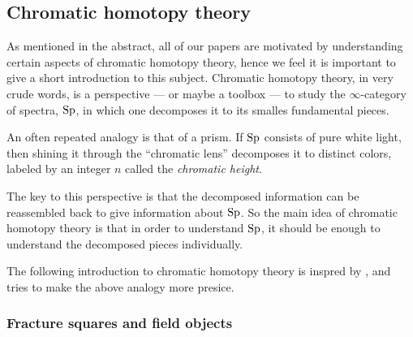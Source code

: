 

\subsection{Chromatic homotopy theory}
\label{ch0:ssec:chromatic-homotopy-theory}

As mentioned in the abstract, all of our papers are motivated by understanding certain aspects of chromatic homotopy theory, hence we feel it is important to give a short introduction to this subject. Chromatic homotopy theory, in very crude words, is a perspective --- or maybe a toolbox --- to study the $\infty$-category of spectra, $\mathrm{Sp}$, in which one decomposes it to its smalles fundamental pieces. 

An often repeated analogy is that of a prism. If $\mathrm{Sp}$ consists of pure white light, then shining it through the ``chromatic lens'' decomposes it to distinct colors, labeled by an integer $n$ called the \emph{chromatic height}. 

\begin{center}
\end{center}

The key to this perspective is that the decomposed information can be reassembled back to give information about $\mathrm{Sp}$. So the main idea of chromatic homotopy theory is that in order to understand $\mathrm{Sp}$, it should be enough to understand the decomposed pieces individually. 

The following introduction to chromatic homotopy theory is inspred by \cite{barthel-beaudry_19}, and tries to make the above analogy more presice. 

\subsubsection{Fracture squares and field objects}
\label{ch0:sssec:fracture-squares}

